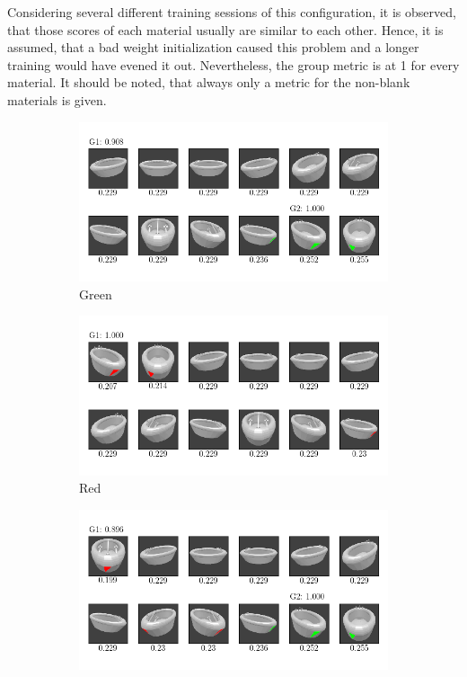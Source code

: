 Considering several different training sessions of this configuration, it is observed, that those scores of each material usually are similar to each other.
Hence, it is assumed, that a bad weight initialization caused this problem and a longer training would have evened it out.
Nevertheless, the group metric is at 1 for every material.
It should be noted, that always only a metric for the non-blank materials is given.
\begin{figure}
	\centering
	\begin{subfigure}{\textwidth}
		\includegraphics[trim=10 20 10 20, clip]{images/mn-sl-0-4-20/bathtub_0107_1_grouping.png}
		\caption{Green}
		\label{fig:grouping-0-4-green}
	\end{subfigure}
	\begin{subfigure}{\textwidth}
		\includegraphics[trim=10 20 10 20, clip]{images/mn-sl-0-4-20/bathtub_0107_2_grouping.png}
		\caption{Red}
		\label{fig:grouping-0-4-red}
	\end{subfigure}
	\begin{subfigure}{\textwidth}
		\includegraphics[trim=10 20 10 20, clip]{images/mn-sl-0-4-20/bathtub_0107_3_grouping.png}

\end{subfigure}
\end{figure}
